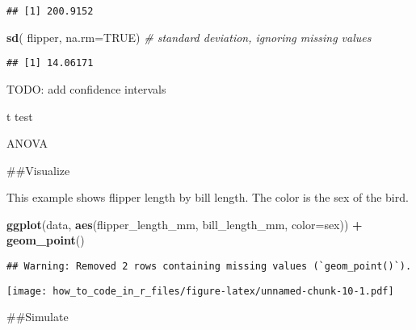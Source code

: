 \documentclass[
]{article}
\newenvironment{Shaded}{\begin{snugshade}}{\end{snugshade}}
\newcommand{\AttributeTok}[1]{\textcolor[rgb]{0.13,0.29,0.53}{#1}}
\newcommand{\CommentTok}[1]{\textcolor[rgb]{0.56,0.35,0.01}{\textit{#1}}}
\newcommand{\ConstantTok}[1]{\textcolor[rgb]{0.56,0.35,0.01}{#1}}
\newcommand{\FunctionTok}[1]{\textcolor[rgb]{0.13,0.29,0.53}{\textbf{#1}}}
\newcommand{\NormalTok}[1]{#1}
\newcommand{\SpecialCharTok}[1]{\textcolor[rgb]{0.81,0.36,0.00}{\textbf{#1}}}
\begin{document}
\begin{verbatim}
## [1] 200.9152
\end{verbatim}

\begin{Shaded}
\begin{Highlighting}[]
\FunctionTok{sd}\NormalTok{( flipper, }\AttributeTok{na.rm=}\ConstantTok{TRUE}\NormalTok{) }\CommentTok{\# standard deviation, ignoring missing values}
\end{Highlighting}
\end{Shaded}

\begin{verbatim}
## [1] 14.06171
\end{verbatim}

TODO: add confidence intervals

t test

ANOVA

\#\#Visualize

This example shows flipper length by bill length. The color is the sex
of the bird.

\begin{Shaded}
\begin{Highlighting}[]
\FunctionTok{ggplot}\NormalTok{(data, }\FunctionTok{aes}\NormalTok{(flipper\_length\_mm, bill\_length\_mm, }\AttributeTok{color=}\NormalTok{sex)) }\SpecialCharTok{+}
    \FunctionTok{geom\_point}\NormalTok{()}
\end{Highlighting}
\end{Shaded}

\begin{verbatim}
## Warning: Removed 2 rows containing missing values (`geom_point()`).
\end{verbatim}

\texttt{[image: how\_to\_code\_in\_r\_files/figure-latex/unnamed-chunk-10-1.pdf]}

\#\#Simulate
\end{document}
